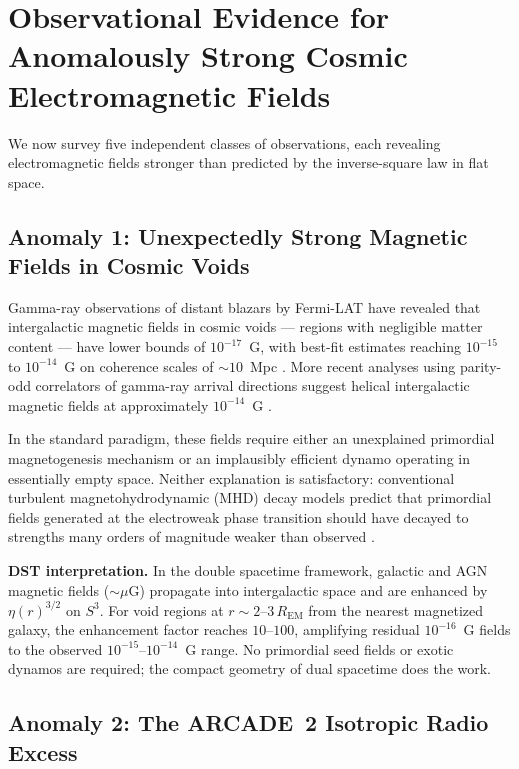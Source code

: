 \documentclass[a4paper]{article}
\begin{document}
\section{Observational Evidence for Anomalously Strong Cosmic Electromagnetic Fields}
\label{sec:observations}

We now survey five independent classes of observations, each revealing
electromagnetic fields stronger than predicted by the inverse-square law in flat
space.

\subsection{Anomaly 1: Unexpectedly Strong Magnetic Fields in Cosmic Voids}
\label{subsec:voids}

Gamma-ray observations of distant blazars by Fermi-LAT have revealed that
intergalactic magnetic fields in cosmic voids --- regions with negligible matter
content --- have lower bounds of $10^{-17}$~G, with best-fit estimates reaching
$10^{-15}$ to $10^{-14}$~G on coherence scales of $\sim 10$~Mpc
\cite{neronov2010,tavecchio2010,fermi-igmf}. More recent analyses using
parity-odd correlators of gamma-ray arrival directions suggest helical
intergalactic magnetic fields at approximately $10^{-14}$~G \cite{tashiro2014}.

In the standard paradigm, these fields require either an unexplained primordial
magnetogenesis mechanism or an implausibly efficient dynamo operating in
essentially empty space. Neither explanation is satisfactory: conventional
turbulent magnetohydrodynamic (MHD) decay models predict that primordial fields
generated at the electroweak phase transition should have decayed to strengths
many orders of magnitude weaker than observed \cite{banerjee2004}.

\textbf{DST interpretation.} In the double spacetime framework, galactic and AGN
magnetic fields ($\sim \mu$G) propagate into intergalactic space and are
enhanced by $\eta(r)^{3/2}$ on $S^3$. For void regions at
$r \sim 2$--$3\,R_{\text{EM}}$ from the nearest magnetized galaxy, the
enhancement factor reaches $10$--$100$, amplifying residual $10^{-16}$~G fields
to the observed $10^{-15}$--$10^{-14}$~G range. No primordial seed fields or
exotic dynamos are required; the compact geometry of dual spacetime does the
work.

\subsection{Anomaly 2: The ARCADE~2 Isotropic Radio Excess}
\label{subsec:arcade}
\end{document}
